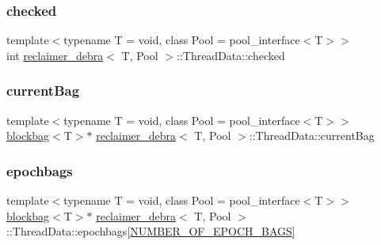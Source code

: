 \subsubsection{\texorpdfstring{checked}{checked}}
{\footnotesize\ttfamily template$<$typename T  = void, class Pool  = pool\+\_\+interface$<$\+T$>$$>$ \\
int \hyperlink{classreclaimer__debra}{reclaimer\+\_\+debra}$<$ T, Pool $>$\+::Thread\+Data\+::checked}

\mbox{\label{classreclaimer__debra_1_1ThreadData_a13ae47aafc34001c5225b8f2fa0c06c8}} 
\subsubsection{\texorpdfstring{current\+Bag}{currentBag}}
{\footnotesize\ttfamily template$<$typename T  = void, class Pool  = pool\+\_\+interface$<$\+T$>$$>$ \\
\hyperlink{classblockbag}{blockbag}$<$T$>$$\ast$ \hyperlink{classreclaimer__debra}{reclaimer\+\_\+debra}$<$ T, Pool $>$\+::Thread\+Data\+::current\+Bag}

\mbox{\label{classreclaimer__debra_1_1ThreadData_ae2a76ecf79487fd59dc98f9e3db227b8}} 
\subsubsection{\texorpdfstring{epochbags}{epochbags}}
{\footnotesize\ttfamily template$<$typename T  = void, class Pool  = pool\+\_\+interface$<$\+T$>$$>$ \\
\hyperlink{classblockbag}{blockbag}$<$T$>$$\ast$ \hyperlink{classreclaimer__debra}{reclaimer\+\_\+debra}$<$ T, Pool $>$\+::Thread\+Data\+::epochbags\mbox{[}\hyperlink{reclaimer__ebr__tree__q_8h_acc0cc9ce1a68a29c4e0e126887b517dd}{N\+U\+M\+B\+E\+R\+\_\+\+O\+F\+\_\+\+E\+P\+O\+C\+H\+\_\+\+B\+A\+GS}\mbox{]}}

\mbox{\label{classreclaimer__debra_1_1ThreadData_ab02bc86812759af0725038ef64c52200}} 
